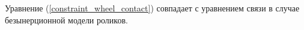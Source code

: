 Уравнение (\ref{constraint_wheel_contact}) совпадает с уравнением связи в случае безынерционной модели роликов. 



